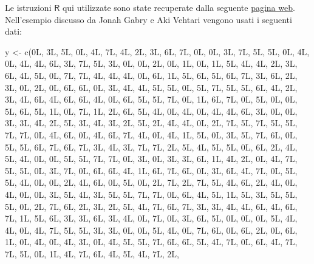 \documentclass[
  10pt,
  italian,
  a4paper,
  extrafontsizes,onecolumn,openright
  ]{memoir}
\newenvironment{Shaded}{\begin{snugshade}}{\end{snugshade}}
\newcommand{\FunctionTok}[1]{\textcolor[rgb]{0.00,0.00,0.00}{#1}}
\newcommand{\NormalTok}[1]{#1}
\newcommand{\OtherTok}[1]{\textcolor[rgb]{0.56,0.35,0.01}{#1}}
\newcommand{\R}{\textsf{R}} %
\begin{document}
Le istruzioni \(\R\) qui utilizzate sono state recuperate dalla seguente \href{http://avehtari.github.io/BDA_R_demos/demos_rstan/ppc/poisson-ppc.html\#}{pagina web}. Nell'esempio discusso da Jonah Gabry e Aki Vehtari vengono usati i seguenti dati:

\begin{Shaded}
\begin{Highlighting}[]
\NormalTok{y }\OtherTok{\textless{}{-}} \FunctionTok{c}\NormalTok{(0L, 3L, 5L, 0L, 4L, 7L, 4L, 2L, 3L, }
\NormalTok{       6L, 7L, 0L, 0L, 3L, 7L, 5L, 5L, 0L, }
\NormalTok{       4L, 0L, 4L, 4L, 6L, 3L, 7L, 5L, 3L, }
\NormalTok{       0L, 0L, 2L, 0L, 1L, 0L, 1L, 5L, 4L, }
\NormalTok{       4L, 2L, 3L, 6L, 4L, 5L, 0L, 7L, 7L, }
\NormalTok{       4L, 4L, 4L, 0L, 6L, 1L, 5L, 6L, 5L, }
\NormalTok{       6L, 7L, 3L, 6L, 2L, 3L, 0L, 2L, 0L, }
\NormalTok{       6L, 6L, 0L, 3L, 4L, 4L, 5L, 5L, 0L, }
\NormalTok{       5L, 7L, 5L, 5L, 6L, 4L, 2L, 3L, 4L, }
\NormalTok{       6L, 4L, 6L, 6L, 4L, 0L, 6L, 5L, 5L, }
\NormalTok{       7L, 0L, 1L, 6L, 7L, 0L, 5L, 0L, 0L, }
\NormalTok{       5L, 6L, 5L, 1L, 0L, 7L, 1L, 2L, 6L, }
\NormalTok{       5L, 4L, 0L, 4L, 0L, 4L, 4L, 6L, 3L, }
\NormalTok{       0L, 0L, 3L, 3L, 4L, 2L, 5L, 3L, 4L, }
\NormalTok{       3L, 2L, 5L, 2L, 4L, 4L, 0L, 2L, 7L, }
\NormalTok{       5L, 7L, 5L, 5L, 7L, 7L, 0L, 4L, 6L, }
\NormalTok{       0L, 4L, 6L, 7L, 4L, 0L, 4L, 1L, 5L, }
\NormalTok{       0L, 3L, 5L, 7L, 6L, 0L, 5L, 5L, 6L, }
\NormalTok{       7L, 6L, 7L, 3L, 4L, 3L, 7L, 7L, 2L, }
\NormalTok{       5L, 4L, 5L, 5L, 0L, 6L, 2L, 4L, 5L, }
\NormalTok{       4L, 0L, 0L, 5L, 5L, 7L, 7L, 0L, 3L, }
\NormalTok{       0L, 3L, 3L, 6L, 1L, 4L, 2L, 0L, 4L, }
\NormalTok{       7L, 5L, 5L, 0L, 3L, 7L, 0L, 6L, 6L, }
\NormalTok{       4L, 1L, 6L, 7L, 6L, 0L, 3L, 6L, 4L, }
\NormalTok{       7L, 0L, 5L, 5L, 4L, 0L, 0L, 2L, 4L, }
\NormalTok{       6L, 0L, 5L, 0L, 2L, 7L, 2L, 7L, 5L, }
\NormalTok{       4L, 6L, 2L, 4L, 0L, 4L, 0L, 0L, 3L, }
\NormalTok{       5L, 4L, 3L, 5L, 5L, 7L, 7L, 0L, 6L, }
\NormalTok{       4L, 5L, 1L, 5L, 3L, 5L, 5L, 5L, 0L, }
\NormalTok{       2L, 7L, 6L, 2L, 3L, 2L, 5L, 4L, 7L, }
\NormalTok{       6L, 7L, 3L, 3L, 4L, 4L, 6L, 4L, 6L, }
\NormalTok{       7L, 1L, 5L, 6L, 3L, 3L, 6L, 3L, 4L, }
\NormalTok{       0L, 7L, 0L, 3L, 6L, 5L, 0L, 0L, 0L, }
\NormalTok{       5L, 4L, 4L, 0L, 4L, 7L, 5L, 5L, 3L, }
\NormalTok{       3L, 0L, 0L, 5L, 4L, 0L, 7L, 6L, 0L, }
\NormalTok{       6L, 2L, 0L, 6L, 1L, 0L, 4L, 0L, 4L, }
\NormalTok{       3L, 0L, 4L, 5L, 5L, 7L, 6L, 6L, 5L, }
\NormalTok{       4L, 7L, 0L, 6L, 4L, 7L, 7L, 5L, 0L, }
\NormalTok{       1L, 4L, 7L, 6L, 4L, 5L, 4L, 7L, 2L, }

\end{Highlighting}
\end{Shaded}
\end{document}
